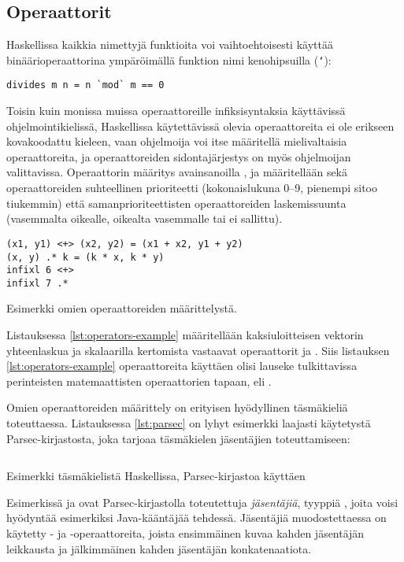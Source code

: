 \subsection{Operaattorit}
Haskellissa kaikkia nimettyjä funktioita voi vaihtoehtoisesti käyttää binäärioperaattorina ympäröimällä funktion nimi kenohipsuilla (\texttt{`}):
\begin{verbatim}
divides m n = n `mod` m == 0
\end{verbatim}

Toisin kuin monissa muissa operaattoreille infiksisyntaksia käyttävissä ohjelmointikielissä,
Haskellissa käytettävissä olevia operaattoreita ei ole erikseen kovakoodattu kieleen,
vaan ohjelmoija voi itse määritellä mielivaltaisia operaattoreita,
ja operaattoreiden sidontajärjestys on myös ohjelmoijan valittavissa.
Operaattorin määritys avainsanoilla ,  ja  määritellään sekä
operaattoreiden suhteellinen prioriteetti (kokonaislukuna 0--9, pienempi sitoo tiukemmin) että
samanprioriteettisten operaattoreiden laskemissuunta
(vasemmalta oikealle, oikealta vasemmalle tai ei sallittu).

\begin{listing}[H]
\begin{verbatim}
(x1, y1) <+> (x2, y2) = (x1 + x2, y1 + y2)
(x, y) .* k = (k * x, k * y)
infixl 6 <+>
infixl 7 .*
\end{verbatim}
\label{lst:operators-example}
\caption{Esimerkki omien operaattoreiden määrittelystä.}
\end{listing}

Listauksessa \ref{lst:operators-example} määritellään kaksiuloitteisen vektorin yhteenlaskua
ja skalaarilla kertomista vastaavat operaattorit \Haskell{<+>} ja .
Siis listauksen \ref{lst:operators-example} operaattoreita käyttäen olisi lauseke
 tulkittavissa perinteisten matemaattisten operaattorien tapaan,
eli .

Omien operaattoreiden määrittely on erityisen hyödyllinen täsmäkieliä toteuttaessa.
Listauksessa \ref{lst:parsec} on lyhyt esimerkki laajasti käytetystä Parsec-kirjastosta,
joka tarjoaa täsmäkielen jäsentäjien toteuttamiseen:
\begin{listing}[H]
    \inputminted{haskell}{codes/Parsec.hs}
    \label{lst:parsec}
    \caption{Esimerkki täsmäkielistä Haskellissa, Parsec-kirjastoa käyttäen}
\end{listing}
Esimerkissä  ja  ovat Parsec-kirjastolla toteutettuja \emph{jäsentäjiä},
tyyppiä , joita voisi hyödyntää esimerkiksi Java-kääntäjää tehdessä.
Jäsentäjiä muodostettaessa on käytetty \Haskell{<|>}- ja \Haskell{>>} -operaattoreita,
joista ensimmäinen kuvaa kahden jäsentäjän leikkausta ja jälkimmäinen kahden jäsentäjän konkatenaatiota.

